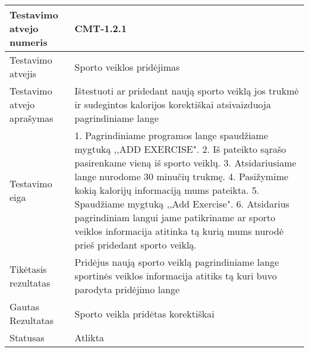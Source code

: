 \documentclass[oneside]{VUMIFPSkursinis}
\begin{document}
\begin{center}
    \begin{tabular}{ |p{5cm}|p{13cm}|}
    \hline
    	Testavimo atvejo numeris & CMT-1.2.1\\ \hline
    	Testavimo atvejis & Sporto veiklos pridėjimas \\ \hline
	Testavimo atvejo aprašymas & Ištestuoti ar pridedant naują sporto veiklą jos trukmė ir sudegintos kalorijos korektiškai atsivaizduoja pagrindiniame lange    \\ \hline
	Testavimo eiga &1. Pagrindiniame programos lange spaudžiame mygtuką ,,ADD EXERCISE". 
				2. Iš pateikto sąrašo pasirenkame vieną iš sporto veiklų. 
				3. Atsidariusiame lange nurodome 30 minučių trukmę.
				4. Pasižymime kokią kalorijų informaciją mums pateikta. 
				5. Spaudžiame mygtuką ,,Add Exercise".
				6. Atsidarius pagrindiniam langui jame patikriname ar sporto veiklos informacija atitinka tą kurią mums nurodė prieš pridedant sporto veiklą.\\ \hline
	Tikėtasis rezultatas &  Pridėjus naują sporto veiklą pagrindiniame lange sportinės veiklos informacija atitiks tą kuri buvo parodyta pridėjimo lange\\ \hline
	Gautas Rezultatas & Sporto veikla pridėtas korektiškai  \\ \hline
	Statusas &  Atlikta\\ \hline
    \hline
    \end{tabular}
\end{center}
\end{document}
